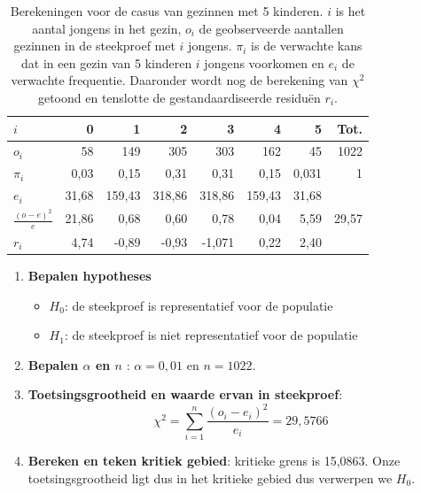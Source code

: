 \begin{table}
  \centering
  \begin{tabular}{@{}lrrrrrrr@{}}
  	\toprule
  	$i$                   &     0 &      1 &      2 &      3 &      4 &     5 &  Tot. \\
  	\midrule
  	$o_i$                 &    58 &    149 &    305 &    303 &    162 &    45 &  1022 \\
  	$\pi_i$               &  0,03 &   0,15 &   0,31 &   0,31 &   0,15 & 0,031 &     1 \\
  	$e_i$                 & 31,68 & 159,43 & 318,86 & 318,86 & 159,43 & 31,68 &       \\
  	$\frac{(o-e)^{2}}{e}$ & 21,86 &   0,68 &   0,60 &   0,78 &   0,04 &  5,59 & 29,57 \\
  	$r_i$                 &  4,74 &  -0,89 &  -0,93 & -1,071 &   0,22 &  2,40 &       \\
  	\bottomrule
  \end{tabular}
  \caption{Berekeningen voor de casus van gezinnen met 5 kinderen. $i$ is het aantal jongens in het gezin, $o_i$ de geobserveerde aantallen gezinnen in de steekproef met $i$ jongens. $\pi_i$ is de verwachte kans dat in een gezin van 5 kinderen $i$ jongens voorkomen en $e_i$ de verwachte frequentie. Daaronder wordt nog de berekening van $\chi^2$ getoond en tenslotte de gestandaardiseerde residuën $r_i$.}
  \label{tab:5-kinderen-berekeningen}
\end{table}

\begin{enumerate}
  \item \textbf{Bepalen hypotheses}
  
  \begin{itemize}
    \item $H_{0}$: de steekproef is representatief voor de populatie
    \item $H_{1}$: de steekproef is niet representatief voor de populatie
  \end{itemize}
  \item \textbf{Bepalen $\alpha$ en $n$} : $\alpha = 0,01$ en $n = 1022$.
  \item \textbf{Toetsingsgrootheid en waarde ervan in steekproef}:
  \[ \chi^{2} = \sum_{i=1}^{n} \frac{(o_{i} - e_{i})^{2}}{e_{i}} = 29,5766 \]
  \item \textbf{Bereken en teken kritiek gebied}:  kritieke grens is 15,0863. Onze toetsingsgrootheid ligt dus in het kritieke gebied dus verwerpen we $H_{0}$. 
\end{enumerate}

